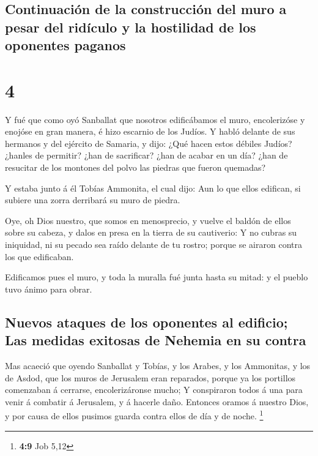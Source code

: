 \hypertarget{continuaciuxf3n-de-la-construcciuxf3n-del-muro-a-pesar-del-riduxedculo-y-la-hostilidad-de-los-oponentes-paganos}{%
\subsection{Continuación de la construcción del muro a pesar del
ridículo y la hostilidad de los oponentes
paganos}\label{continuaciuxf3n-de-la-construcciuxf3n-del-muro-a-pesar-del-riduxedculo-y-la-hostilidad-de-los-oponentes-paganos}}

\hypertarget{section-3}{%
\section{4}\label{section-3}}

 Y fué que como oyó Sanballat que nosotros edificábamos el
muro, encolerizóse y enojóse en gran manera, é hizo escarnio de los
Judíos.  Y habló delante de sus hermanos y del ejército de
Samaria, y dijo: ¿Qué hacen estos débiles Judíos? ¿hanles de permitir?
¿han de sacrificar? ¿han de acabar en un día? ¿han de resucitar de los
montones del polvo las piedras que fueron quemadas?

 Y estaba junto á él Tobías Ammonita, el cual dijo: Aun lo
que ellos edifican, si subiere una zorra derribará su muro de piedra.

 Oye, oh Dios nuestro, que somos en menosprecio, y vuelve el
baldón de ellos sobre su cabeza, y dalos en presa en la tierra de su
cautiverio:  Y no cubras su iniquidad, ni su pecado sea
raído delante de tu rostro; porque se airaron contra los que edificaban.

 Edificamos pues el muro, y toda la muralla fué junta hasta
su mitad: y el pueblo tuvo ánimo para obrar.

\hypertarget{nuevos-ataques-de-los-oponentes-al-edificio-las-medidas-exitosas-de-nehemia-en-su-contra}{%
\subsection{Nuevos ataques de los oponentes al edificio; Las medidas
exitosas de Nehemia en su
contra}\label{nuevos-ataques-de-los-oponentes-al-edificio-las-medidas-exitosas-de-nehemia-en-su-contra}}

 Mas acaeció que oyendo Sanballat y Tobías, y los Arabes, y
los Ammonitas, y los de Asdod, que los muros de Jerusalem eran
reparados, porque ya los portillos comenzaban á cerrarse,
encolerizáronse mucho;  Y conspiraron todos á una para venir
á combatir á Jerusalem, y á hacerle daño.  Entonces oramos á
nuestro Dios, y por causa de ellos pusimos guarda contra ellos de día y
de noche. \footnote{\textbf{4:9} Job 5,12}

